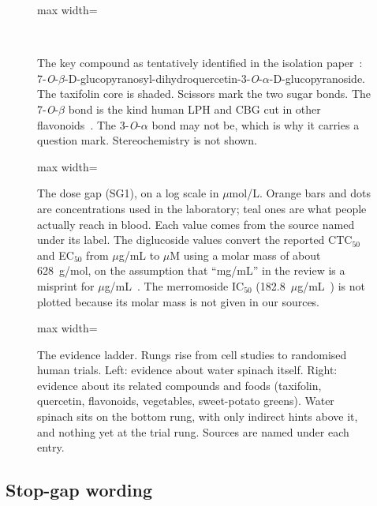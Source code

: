 \documentclass[11pt,a4paper]{article}
\newcommand{\DQG}{7-\emph{O}-$\beta$-D-glucopyranosyl-dihydroquercetin-3-\emph{O}-$\alpha$-D-glucopyranoside}
\begin{document}
\begin{figure}[tbp]
\centering
\begin{adjustbox}{max width=\linewidth}\end{adjustbox}\\[4pt]
\evlegend
\caption{The key compound as tentatively identified in the isolation paper~\cite{prasad2005}: \DQG. The taxifolin core is shaded. Scissors mark the two sugar bonds. The 7-\emph{O}-$\beta$ bond is the kind human LPH and CBG cut in other flavonoids~\cite{day1998}. The 3-\emph{O}-$\alpha$ bond may not be, which is why it carries a question mark. Stereochemistry is not shown.}
\label{fig:compound}
\end{figure}

\begin{figure}[tbp]
\centering
\begin{adjustbox}{max width=\linewidth}\end{adjustbox}
\caption{The dose gap (SG1), on a log scale in $\mu$mol/L. Orange bars and dots are concentrations used in the laboratory; teal ones are what people actually reach in blood. Each value comes from the source named under its label. The diglucoside values convert the reported CTC$_{50}$ and EC$_{50}$ from $\mu$g/mL to $\mu$M using a molar mass of about 628~g/mol, on the assumption that ``mg/mL'' in the review is a misprint for $\mu$g/mL~\cite{prasad2005b,meira2012}. The merromoside IC$_{50}$ (182.8~$\mu$g/mL~\cite{sasikala2022}) is not plotted because its molar mass is not given in our sources.}
\label{fig:dose}
\end{figure}

\begin{figure}[tbp]
\centering
\begin{adjustbox}{max width=\linewidth}\end{adjustbox}
\caption{The evidence ladder. Rungs rise from cell studies to randomised human trials. Left: evidence about water spinach itself. Right: evidence about its related compounds and foods (taxifolin, quercetin, flavonoids, vegetables, sweet-potato greens). Water spinach sits on the bottom rung, with only indirect hints above it, and nothing yet at the trial rung. Sources are named under each entry.}
\label{fig:ladder}
\end{figure}

\subsection{Stop-gap wording}
\end{document}
